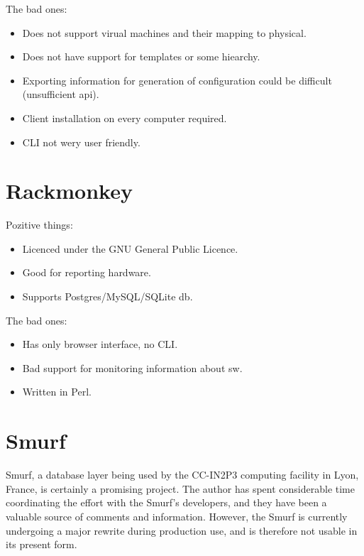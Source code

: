 \documentclass[12pt]{article}
\begin{document}
The bad ones:
\begin{itemize}
\item Does not support virual machines and their mapping to physical.
\item Does not have support for templates or some hiearchy.
\item Exporting information for generation of configuration could be difficult (unsufficient api). %
\item Client installation on every computer required.
\item CLI not wery user friendly.
\end{itemize}




\section{Rackmonkey}
Pozitive things:
\begin{itemize}
\item Licenced under the GNU General Public Licence.
\item Good for reporting hardware.
\item Supports Postgres/MySQL/SQLite db.
\end{itemize}


The bad ones:
\begin{itemize}
\item Has only browser interface, no CLI.
\item Bad support for monitoring information about sw.
\item Written in Perl.
\end{itemize}



\section{Smurf}

Smurf, a database layer being used by the CC-IN2P3 computing facility in Lyon,
France, is certainly a promising project.  The author has spent considerable
time coordinating the effort with the Smurf's developers, and they have been a
valuable source of comments and information.  However, the Smurf is currently
undergoing a major rewrite during production use, and is therefore not usable in
its present form.
\end{document}
